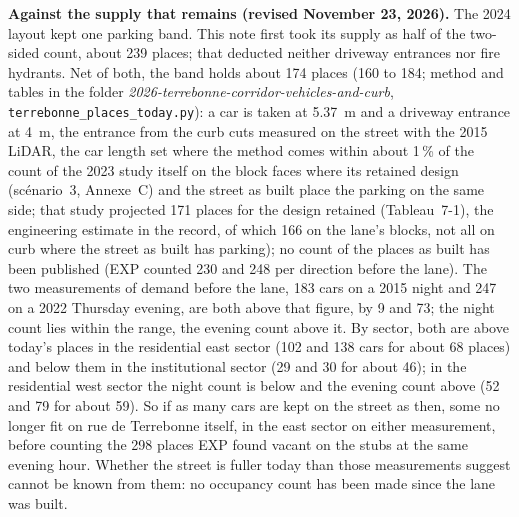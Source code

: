\documentclass[11pt,a4paper]{article}
\begin{document}
\textbf{Against the supply that remains (revised November 23, 2026).} The 2024 layout kept one parking band. This note first took its supply as half of the two-sided count, about 239 places; that deducted neither driveway entrances nor fire hydrants. Net of both, the band holds about 174 places (160 to 184; method and tables in the folder \emph{2026-terrebonne-corridor-vehicles-and-curb}, \texttt{terrebonne\_places\_today.py}): a car is taken at 5.37~m and a driveway entrance at 4~m, the entrance from the curb cuts measured on the street with the 2015 LiDAR, the car length set where the method comes within about 1\,\% of the count of the 2023 study itself on the block faces where its retained design (sc\'enario~3, Annexe~C) and the street as built place the parking on the same side; that study projected 171 places for the design retained (Tableau~7-1), the engineering estimate in the record, of which 166 on the lane\textquoteright{}s blocks, not all on curb where the street as built has parking); no count of the places as built has been published (EXP counted 230 and 248 per direction before the lane). The two measurements of demand before the lane, 183 cars on a 2015 night and 247 on a 2022 Thursday evening, are both above that figure, by 9 and 73; the night count lies within the range, the evening count above it. By sector, both are above today\textquoteright{}s places in the residential east sector (102 and 138 cars for about 68 places) and below them in the institutional sector (29 and 30 for about 46); in the residential west sector the night count is below and the evening count above (52 and 79 for about 59). So if as many cars are kept on the street as then, some no longer fit on rue de Terrebonne itself, in the east sector on either measurement, before counting the 298 places EXP found vacant on the stubs at the same evening hour. Whether the street is fuller today than those measurements suggest cannot be known from them: no occupancy count has been made since the lane was built.
\end{document}
